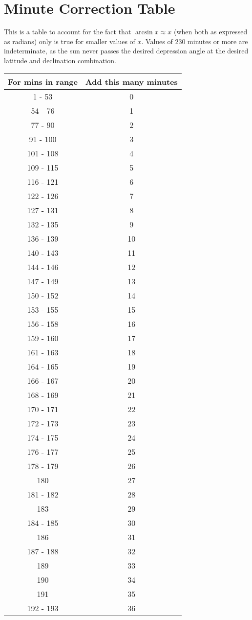 \section{Minute Correction Table}

This is a table to account for the fact that $\arcsin x \approx x$ (when both as expressed as radians) only is true for smaller values of $x$. Values of 230 minutes or more are indeterminate, as the sun never passes the desired depression angle at the desired latitude and declination combination.

	\begin{minipage}{0.5\textwidth}
\begin{tabular}[t]{c|c}
	For mins in range & Add this many minutes \\\hline
	1 - 53 & 0 \\\hline
	54 - 76 & 1 \\\hline
	77 - 90 & 2 \\\hline
	91 - 100 & 3 \\\hline
	101 - 108 & 4 \\\hline
	109 - 115 & 5 \\\hline
	116 - 121 & 6 \\\hline
	122 - 126 & 7 \\\hline
	127 - 131 & 8 \\\hline
	132 - 135 & 9 \\\hline
	136 - 139 & 10 \\\hline
	140 - 143 & 11 \\\hline
	144 - 146 & 12 \\\hline
	147 - 149 & 13 \\\hline
	150 - 152 & 14 \\\hline
	153 - 155 & 15 \\\hline
	156 - 158 & 16 \\\hline
	159 - 160 & 17 \\\hline
	161 - 163 & 18 \\\hline
	164 - 165 & 19 \\\hline
	166 - 167 & 20 \\\hline
	168 - 169 & 21 \\\hline
	170 - 171 & 22 \\\hline
	172 - 173 & 23 \\\hline
	174 - 175 & 24 \\\hline
	176 - 177 & 25 \\\hline
	178 - 179 & 26 \\\hline
	180  & 27 \\\hline
		181 - 182 & 28 \\\hline
	183 & 29 \\\hline
	184 - 185 & 30 \\\hline
	186 & 31 \\\hline
	187 - 188 & 32 \\\hline
	189 & 33 \\\hline
	190 & 34 \\\hline
	191 & 35 \\\hline
	192 - 193 & 36 \\\hline
	\end{tabular}\end{minipage}

